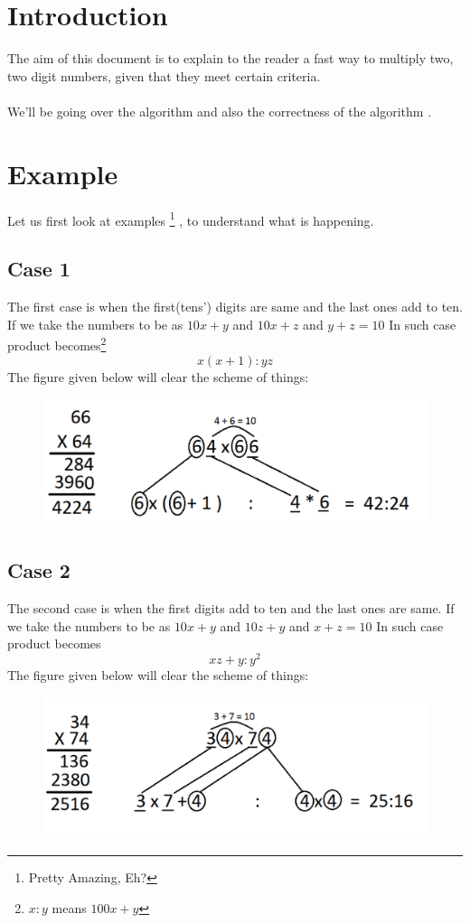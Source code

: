 \section{Introduction}
\label{sec:intro}
The aim of this document is to explain to the reader a fast way to multiply two, two digit numbers, given that they meet certain criteria.
\\
\\
We'll be going over the algorithm \cite{atharv} and also the correctness of the algorithm \cite{sidpaper}.

\section{Example}
\label{sec:example}
Let us first look at examples \footnote{Pretty Amazing, Eh?} , to understand what is happening.
\subsection{Case 1}
\label{subsec:c1}
The first case is when the first(tens') digits are same and the last ones add to ten.
If we take the numbers to be as $10x+y$ and $10x+z$ and $y+z=10$
In such case product becomes\footnote{ $x : y$ means $100x + y$}
$$x(x+1) : yz$$
The figure given below will clear the scheme of things:
\begin{figure}[h]
\centering
\includegraphics[scale=0.4]{case1.pdf}
\end{figure}
\subsection{Case 2}
\label{subsec:c2}
The second case is when the first digits add to ten and the last ones are same.
If we take the numbers to be as $10x+y$ and $10z+y$ and $x+z=10$
In such case product becomes
$$xz + y : y^2$$
The figure given below will clear the scheme of things:
\begin{figure}[h]
\centering
\includegraphics[scale=0.4]{case2.pdf}
\end{figure}
\newpage
